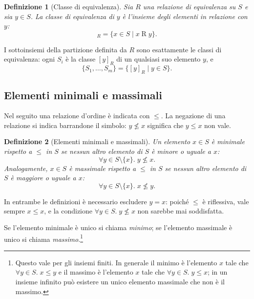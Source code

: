 \documentclass[a4paper, 11pt, oneside]{book}
\theoremstyle{formale}
\newtheorem*{definition}{Definizione}
\begin{document}
    \begin{definition}[Classe di equivalenza]
        Sia $R$ una relazione di equivalenza su $S$ e sia $y \in S$. La \emph{classe di
        equivalenza} di $y$ \`e l'insieme degli elementi in relazione con $y$:
        \begin{equation*}
            [y]_R = \{x \in S \mid x \mathrel{R} y\}.
        \end{equation*}
    \end{definition}
    I sottoinsiemi della partizione definita da $R$ sono esattamente le classi di
    equivalenza: ogni $S_i$ \`e la classe $[y]_R$ di un qualsiasi suo elemento $y$, e
    \begin{equation*}
        \{S_1, \dots, S_m\} = \{[y]_R \mid y \in S\}.
    \end{equation*}

    \subsection{Elementi minimali e massimali}
    Nel seguito una relazione d'ordine \`e indicata con $\leq$. La negazione di una relazione
    si indica barrandone il simbolo: $y \not\leq x$ significa che $y \leq x$ non vale.

    \begin{definition}[Elementi minimali e massimali]
        Un elemento $x \in S$ \`e \emph{minimale} rispetto a $\leq$ in $S$ se nessun altro
        elemento di $S$ \`e minore o uguale a $x$:
        \begin{equation*}
            \forall y \in S \setminus \{x\}.\; y \not\leq x.
        \end{equation*}
        Analogamente, $x \in S$ \`e \emph{massimale} rispetto a $\leq$ in $S$ se nessun
        altro elemento di $S$ \`e maggiore o uguale a $x$:
        \begin{equation*}
            \forall y \in S \setminus \{x\}.\; x \not\leq y.
        \end{equation*}
    \end{definition}
    In entrambe le definizioni \`e necessario escludere $y = x$: poich\'e $\leq$ \`e
    riflessiva, vale sempre $x \leq x$, e la condizione $\forall y \in S.\; y \not\leq x$
    non sarebbe mai soddisfatta.

    Se l'elemento minimale \`e unico si chiama \emph{minimo}; se l'elemento massimale \`e
    unico si chiama \emph{massimo}.\footnote{Questo vale per gli insiemi finiti. In
    generale il minimo \`e l'elemento $x$ tale che $\forall y \in S.\; x \leq y$ e il massimo
    \`e l'elemento $x$ tale che $\forall y \in S.\; y \leq x$; in un insieme infinito pu\`o
    esistere un unico elemento massimale che non \`e il massimo.}
\end{document}
